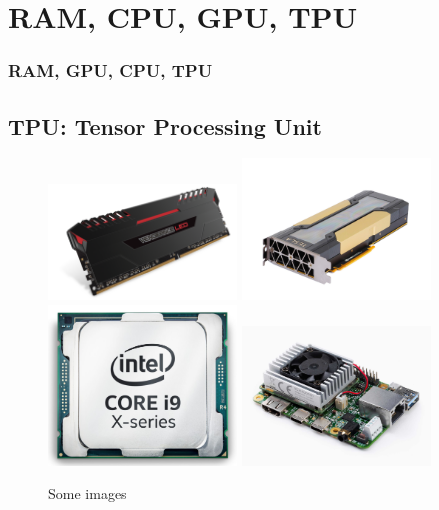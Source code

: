 \documentclass[11pt]{beamer}
\begin{document}
\section{RAM, CPU, GPU, TPU}
\begin{frame}
	\frametitle{RAM, GPU, CPU, TPU}
	\subsection{TPU: Tensor Processing Unit}
	\begin{figure}
		\includegraphics[width=50mm,scale=0.5]{ram5}\hspace{2mm}
		\includegraphics[width=50mm,scale=0.5]{v100}
		\\[\smallskipamount]
		\includegraphics[width=50mm,scale=0.5]{cpu2}\hspace{2mm}
		\includegraphics[width=50mm,scale=0.5]{tpu}
		\caption{Some images}\label{fig:foobar}
	\end{figure}
\end{frame}
\end{document}
